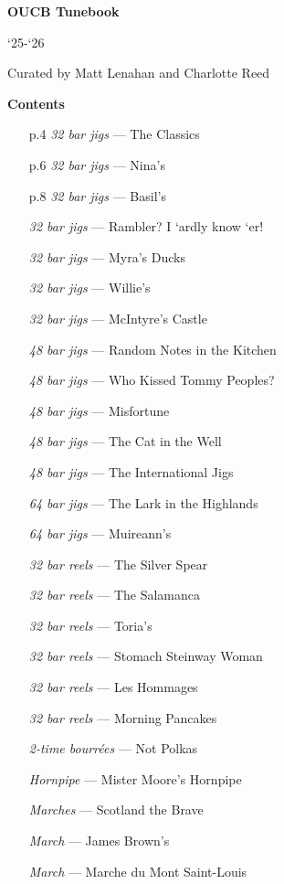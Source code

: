 \documentclass[11pt]{article}
\begin{document}
\vspace*{5\baselineskip}
\centerline{\Huge\textbf{OUCB Tunebook}}
\vspace{\baselineskip}
\centerline{\Large `25-`26}
\vspace{2\baselineskip}
\centerline{Curated by Matt Lenahan and Charlotte Reed}
\clearpage

\centerline{\Large\textbf{Contents}}
\begin{multicols*}{2}
    \begin{enumerate}
        \item[p.4] \textit{32 bar jigs} --- The Classics
        \item[p.6] \textit{32 bar jigs} --- Nina's
        \item[p.8] \textit{32 bar jigs} --- Basil's
        \item[] \textit{32 bar jigs} --- Rambler? I `ardly know `er!
        \item[] \textit{32 bar jigs} --- Myra's Ducks
        \item[] \textit{32 bar jigs} --- Willie's
        \item[] \textit{32 bar jigs} --- McIntyre's Castle
        \item[] \textit{48 bar jigs} --- Random Notes in the Kitchen
        \item[] \textit{48 bar jigs} --- Who Kissed Tommy Peoples?
        \item[] \textit{48 bar jigs} --- Misfortune
        \item[] \textit{48 bar jigs} --- The Cat in the Well
        \item[] \textit{48 bar jigs} --- The International Jigs
        \item[] \textit{64 bar jigs} --- The Lark in the Highlands
        \item[] \textit{64 bar jigs} --- Muireann's
        \item[] \textit{32 bar reels} --- The Silver Spear
        \item[] \textit{32 bar reels} --- The Salamanca
        \item[] \textit{32 bar reels} --- Toria's
        \item[] \textit{32 bar reels} --- Stomach Steinway Woman
        \item[] \textit{32 bar reels} --- Les Hommages
        \item[] \textit{32 bar reels} --- Morning Pancakes
        \item[] \textit{2-time bourr\'ees} --- Not Polkas
        \item[] \textit{Hornpipe} --- Mister Moore's Hornpipe
        \item[] \textit{Marches} --- Scotland the Brave
        \item[] \textit{March} --- James Brown's
        \item[] \textit{March} --- Marche du Mont Saint-Louis
    \end{enumerate}
\end{multicols*}
\clearpage
\end{document}
